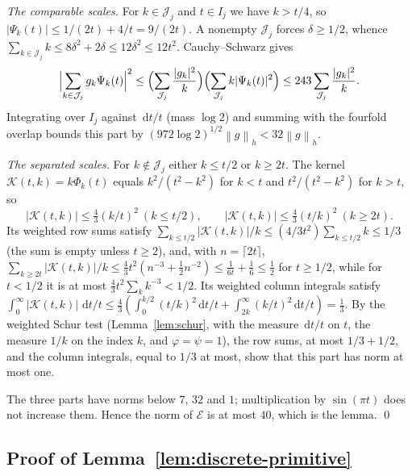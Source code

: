 \documentclass{siamart251216}
\newcommand{\norm}[1]{\left\lVert#1\right\rVert}
\newcommand{\dd}{\,\mathrm d}
\begin{document}
\emph{The comparable scales.} For $k\in\mathcal J_j$ and $t\in I_j$ we
have $k>t/4$, so $|\Psi_k(t)|\le1/(2t)+4/t=9/(2t)$. A nonempty
$\mathcal J_j$ forces $\delta\ge1/2$, whence
$\sum_{k\in\mathcal J_j}k\le8\delta^2+2\delta\le12\delta^2\le12t^2$.
Cauchy--Schwarz gives
\[
 \Bigl|\sum_{k\in\mathcal J_j}g_k\Psi_k(t)\Bigr|^2
 \le\Bigl(\sum_{\mathcal J_j}\frac{|g_k|^2}k\Bigr)
 \Bigl(\sum_{\mathcal J_j}k|\Psi_k(t)|^2\Bigr)
 \le243\sum_{\mathcal J_j}\frac{|g_k|^2}k .
\]
Integrating over $I_j$ against $\dd t/t$ (mass $\log2$) and summing with
the fourfold overlap bounds this part by $(972\log2)^{1/2}\norm g_h<32\norm g_h$.

\emph{The separated scales.} For $k\notin\mathcal J_j$ either
$k\le t/2$ or $k\ge2t$. The kernel $\mathcal K(t,k)=k\Phi_k(t)$ equals
$k^2/(t^2-k^2)$ for $k<t$ and $t^2/(t^2-k^2)$ for $k>t$, so
\[
 |\mathcal K(t,k)|\le\tfrac43(k/t)^2\ (k\le t/2),\qquad
 |\mathcal K(t,k)|\le\tfrac43(t/k)^2\ (k\ge2t).
\]
Its weighted row sums satisfy $\sum_{k\le t/2}|\mathcal K(t,k)|/k
\le(4/3t^2)\sum_{k\le t/2}k\le1/3$ (the sum is empty unless $t\ge2$),
and, with $n=\lceil2t\rceil$,
$\sum_{k\ge2t}|\mathcal K(t,k)|/k\le\tfrac43t^2(n^{-3}+\tfrac12n^{-2})
\le\tfrac1{6t}+\tfrac16\le\tfrac12$ for $t\ge1/2$, while for $t<1/2$
it is at most $\tfrac43t^2\sum_kk^{-3}<1/2$. Its weighted column
integrals satisfy
$\int_0^\infty|\mathcal K(t,k)|\,\dd t/t\le\tfrac43
(\int_0^{k/2}(t/k)^2\dd t/t+\int_{2k}^\infty(k/t)^2\dd t/t)=\tfrac13$.
By the weighted Schur test (Lemma~\ref{lem:schur}, with the measure
$\dd t/t$ on $t$, the measure $1/k$ on the index $k$, and
$\varphi=\psi=1$), the row sums, at most $1/3+1/2$, and the column integrals,
equal to $1/3$ at most, show that this part has norm at most one.

The three parts have norms below $7$, $32$ and $1$; multiplication by
$\sin(\pi t)$ does not increase them. Hence the norm of $\mathcal E$ is at
most $40$, which is the lemma. \qed

\subsection{\texorpdfstring{Proof of Lemma~\ref{lem:discrete-primitive}}{Proof of the discrete primitive lemma}}
\end{document}
